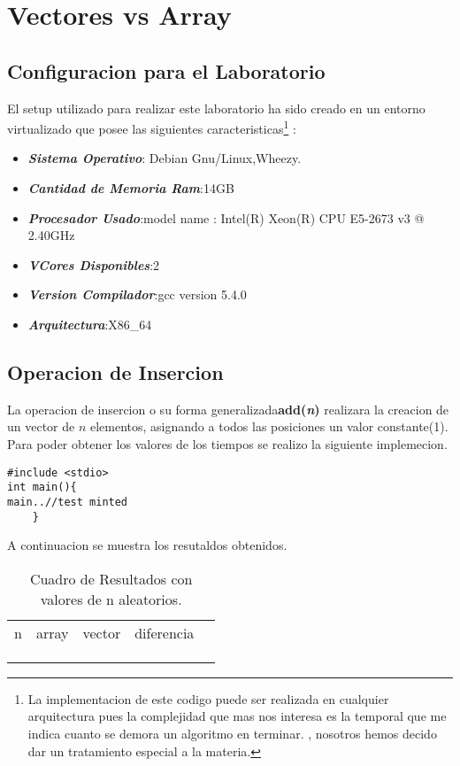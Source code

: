 \documentclass[paper=a4, fontsize=12pt]{article} 		%
\numberwithin{equation}{section}						%
\numberwithin{table}{section} 							%
\begin{document}
\section{Vectores vs Array}
\subsection{Configuracion para el Laboratorio}
El setup utilizado para realizar este laboratorio ha sido creado en un entorno virtualizado que posee las siguientes caracteristicas\footnote{La implementacion de este codigo puede ser realizada en cualquier arquitectura pues la complejidad que mas nos interesa es la temporal que me indica cuanto se demora un algoritmo en terminar.
, nosotros hemos decido dar un tratamiento especial a la materia.} :
\begin{itemize}
\item \textbf{\textit{Sistema Operativo}}: Debian Gnu/Linux,Wheezy.
\item \textbf{\textit{Cantidad de Memoria Ram}}:14GB
\item \textbf{\textit{Procesador Usado}}:model name	: Intel(R) Xeon(R) CPU E5-2673 v3 @ 2.40GHz
\item \textbf{\textit{VCores Disponibles}}:2
\item \textbf{\textit{Version Compilador}}:gcc version 5.4.0 
\item \textbf{\textit{Arquitectura}}:X86\_64
\end{itemize}
\subsection{Operacion de Insercion}
La operacion de insercion o su forma generalizada\textbf{add(\textit{n})} realizara la creacion de un vector de $n$ elementos, asignando a todos las posiciones un valor constante(\textrm{1}). Para poder obtener los valores de los tiempos se realizo la siguiente implemecion. 
\begin{verbatim}
#include <stdio>
int main(){
main..//test minted 
	}
\end{verbatim}
A continuacion se muestra los resutaldos obtenidos.
\begin{table}[H]
\centering
\begin{tabular}{lllll}
\cline{1-4}
\multicolumn{1}{|l|}{n} & \multicolumn{1}{l|}{array} & \multicolumn{1}{l|}{vector} & \multicolumn{1}{l|}{diferencia} &  \\ \cline{1-4}
\multicolumn{1}{|l|}{}  & \multicolumn{1}{l|}{}      & \multicolumn{1}{l|}{}       & \multicolumn{1}{l|}{}           &  \\ \cline{1-4}
\multicolumn{1}{|l|}{}  & \multicolumn{1}{l|}{}      & \multicolumn{1}{l|}{}       & \multicolumn{1}{l|}{}           &  \\ \cline{1-4}
                        &                            &                             &                                 & 
\end{tabular}
\caption{Cuadro de Resultados con valores de n aleatorios.}
\label{insertion}
\end{table}
\end{document}
